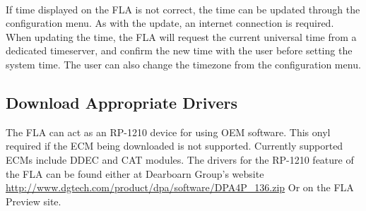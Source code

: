 \documentclass[11pt]{article}
\begin{document}
\paragraph{  }
If time displayed on the FLA is not correct, the time can be updated through the configuration menu. As with the update, an internet connection is required. When updating the time, the FLA will request the current universal time from a dedicated timeserver, and confirm the new time with the user before setting the system time. The user can also change the timezone from the configuration menu.
\subsection{Download Appropriate Drivers}
The FLA can act as an RP-1210 device for using OEM software. This onyl required if the ECM being downloaded is not supported. Currently supported ECMs include DDEC and CAT modules. The drivers for the RP-1210 feature of the FLA can be found either at Dearboarn Group's website
\url{http://www.dgtech.com/product/dpa/software/DPA4P_136.zip} 
Or on the FLA Preview site.
\end{document}
